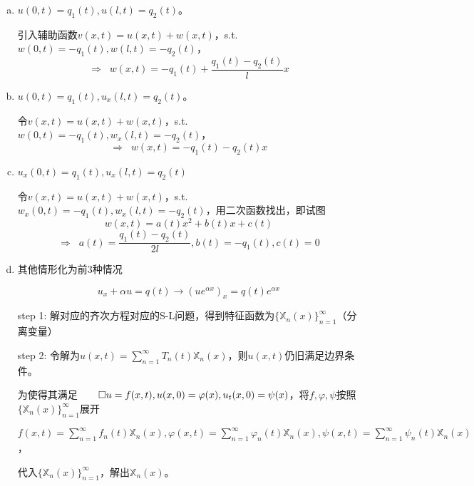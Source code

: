 \documentclass[11pt, a4paper]{article}
\theoremstyle{theorem}
\begin{document}
\begin{enumerate}[(a)]
    \item $u(0,t) = q_1(t), u(l,t) = q_2(t)$。

    引入辅助函数$v(x,t) = u(x,t) + w(x,t)$，s.t.$w(0,t) = -q_1(t),w(l,t) = -q_2(t)$，
    $$
    \Rightarrow \; \; w(x,t) = -q_1(t) + \frac{q_1(t) - q_2(t)}{l}x
    $$

    \item $u(0,t) = q_1(t), u_x(l,t) = q_2(t)$。

    令$v(x,t) = u(x,t) + w(x,t)$，s.t. $w(0,t) = -q_1(t),w_x(l,t) = -q_2(t)$，
    $$
    \Rightarrow \; \; w(x,t) = -q_1(t) - q_2(t)x
    $$

    \item $u_x(0,t) = q_1(t), u_x(l,t) = q_2(t)$

    令$v(x,t) = u(x,t) + w(x,t)$，s.t. $w_x(0,t) = -q_1(t),w_x(l,t) = -q_2(t)$，用二次函数找出，即试图
    $$
    w(x,t) = a(t)x^2 + b(t)x + c(t)
    $$
    $$
    \Rightarrow \; \; a(t) = \frac{q_1(t) - q_2(t)}{2l}, b(t) = -q_1(t), c(t) = 0
    $$

    \item 其他情形化为前3种情况

    $$
    u_x + \alpha u = q(t)  \longrightarrow (u e^{\alpha x})_x = q(t) e^{\alpha x}
    $$

    step 1: 解对应的齐次方程对应的S-L问题，得到特征函数为$\{\mathbb{X}_n(x)\}_{n=1}^{\infty}$（分离变量）

    step 2: 令解为$u(x,t) = \sum_{n=1}^\infty T_n(t) \mathbb{X}_n(x) $，则$u(x,t)$仍旧满足边界条件。

    为使得其满足$\qed u = f(x,t), u(x,0) = \varphi(x), u_t(x,0) = \psi(x)$，将$f,\varphi,\psi$按照$\{\mathbb{X}_n(x)\}_{n=1}^\infty$展开

    $f(x,t) = \sum_{n=1}^\infty f_n(t)\mathbb{X}_n(x), \varphi(x,t) = \sum_{n=1}^\infty \varphi_n(t)\mathbb{X}_n(x), \psi(x,t) = \sum_{n=1}^\infty \psi_n(t)\mathbb{X}_n(x)$，

    代入$\{\mathbb{X}_n(x)\}_{n=1}^{\infty}$，解出$\mathbb{X}_n(x)$。
\end{enumerate}
\end{document}
